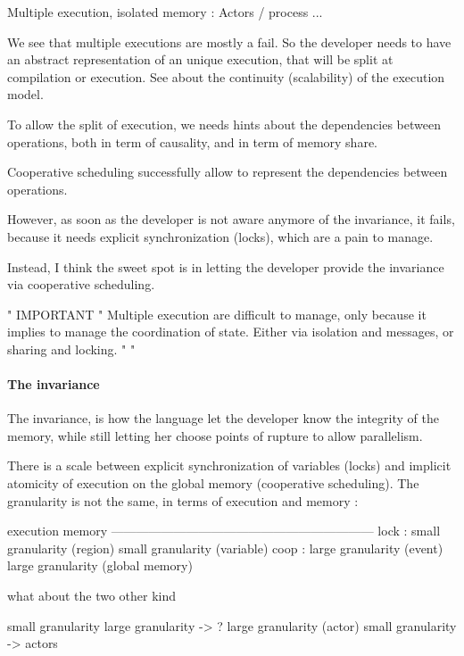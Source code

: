 Multiple execution, isolated memory : Actors / process ...


We see that multiple executions are mostly a fail.
So the developer needs to have an abstract representation of an unique  execution, that will be split at compilation or execution.
See about the continuity (scalability) of the execution model.

To allow the split of execution, we needs hints about the dependencies between operations, both in term of causality, and in term of memory share.

Cooperative scheduling successfully allow to represent the dependencies between operations.

However, as soon as the developer is not aware anymore of the invariance, it fails, because it needs explicit synchronization (locks), which are a pain to manage.

Instead, I think the sweet spot is in letting the developer provide the invariance via cooperative scheduling.

"                               IMPORTANT                                     "
Multiple execution are difficult to manage, only because it implies to manage the coordination of state.
Either via isolation and messages, or sharing and locking.
"                                                                             "

\paragraph{The invariance}

The invariance, is how the language let the developer know the integrity of the memory, while still letting her choose points of rupture to allow parallelism.

There is a scale between explicit synchronization of variables (locks) and implicit atomicity of execution on the global memory (cooperative scheduling).
The granularity is not the same, in terms of execution and memory :

          execution                      memory
        ---------------------------------------------------------------
lock :    small granularity (region)     small granularity (variable)
coop :    large granularity (event)      large granularity (global memory)

what about the two other kind

          small granularity              large granularity     ->    ?
          large granularity (actor)      small granularity     ->  actors




